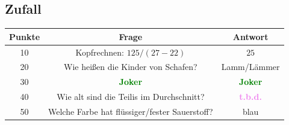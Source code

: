 \documentclass[11pt]{scrartcl}
\begin{document}
\subsection*{Zufall}
\begin{table}[H]
    \begin{tabular}{|c|c|c|}\hline
        \textbf{Punkte}&\textbf{Frage}&\textbf{Antwort}\\\hline
        10&Kopfrechnen: $125/(27-22)$&$25$\\\hline
        20&Wie heißen die Kinder von Schafen?&Lamm/Lämmer\\\hline
        30&\textcolor{green}{\textbf{Joker}}&\textcolor{green}{\textbf{Joker}}\\\hline
        40&Wie alt sind die Teilis im Durchschnitt?&\textcolor{violet}{\textbf{t.b.d.}}\\\hline
        50&Welche Farbe hat flüssiger/fester Sauerstoff?&blau\\\hline
    \end{tabular}
\end{table}
\end{document}
